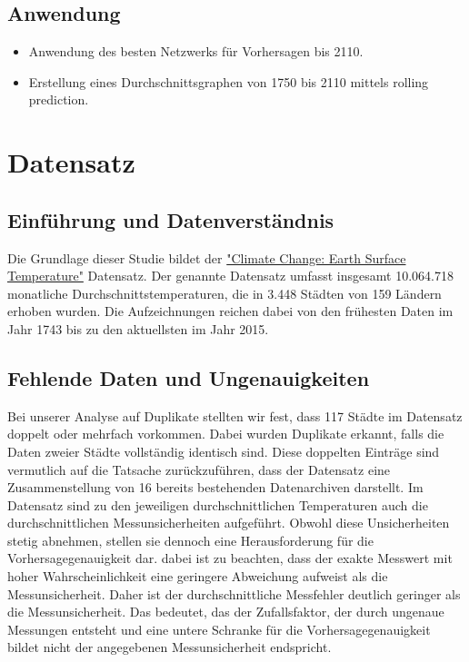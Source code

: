 \documentclass[manuscript,screen,review]{acmart} %
\begin{document}
\subsection*{Anwendung}
\begin{itemize}
    \item Anwendung des besten Netzwerks für Vorhersagen bis 2110.
    \item Erstellung eines Durchschnittsgraphen von 1750 bis 2110 mittels rolling prediction.
\end{itemize}

\section{Datensatz}
\subsection{Einführung und Datenverständnis}
Die Grundlage dieser Studie bildet der \href{https://www.kaggle.com/datasets/berkeleyearth/climate-change-earth-surface-temperature-data?select=GlobalLandTemperaturesByCity.csv}{"Climate Change: Earth Surface Temperature"} Datensatz.
Der genannte Datensatz umfasst insgesamt 10.064.718 monatliche Durchschnittstemperaturen, die in 3.448 Städten von 159 Ländern erhoben wurden. Die Aufzeichnungen reichen dabei von den frühesten Daten im Jahr 1743 bis zu den aktuellsten im Jahr 2015.

\subsection{Fehlende Daten und Ungenauigkeiten}
Bei unserer Analyse auf Duplikate stellten wir fest, dass 117 Städte im Datensatz doppelt oder mehrfach vorkommen. Dabei wurden Duplikate erkannt, falls die Daten zweier Städte vollständig identisch sind.  Diese doppelten Einträge sind vermutlich auf die Tatsache zurückzuführen, dass der Datensatz eine Zusammenstellung von 16 bereits bestehenden Datenarchiven darstellt. Im Datensatz sind zu den jeweiligen durchschnittlichen Temperaturen auch die durchschnittlichen Messunsicherheiten aufgeführt. Obwohl diese Unsicherheiten stetig abnehmen, stellen sie dennoch eine Herausforderung für die Vorhersagegenauigkeit dar. dabei ist zu beachten, dass der exakte Messwert mit hoher Wahrscheinlichkeit eine geringere Abweichung aufweist als die Messunsicherheit. Daher ist der durchschnittliche Messfehler deutlich geringer als die Messunsicherheit.
Das bedeutet, das der Zufallsfaktor, der durch ungenaue Messungen entsteht und eine untere Schranke für die Vorhersagegenauigkeit bildet nicht der angegebenen Messunsicherheit endspricht.
\end{document}
